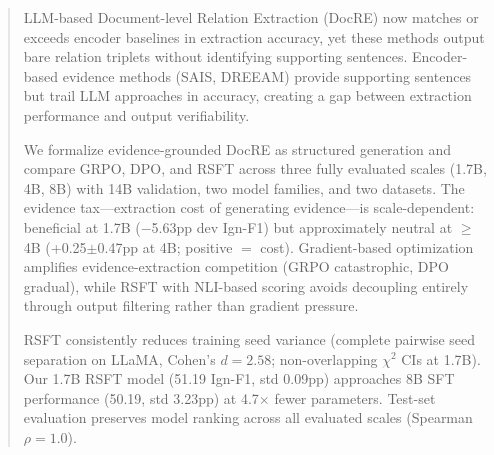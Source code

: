 \begin{abstract}

LLM-based Document-level Relation Extraction (DocRE) now matches or exceeds encoder baselines in extraction accuracy, yet these methods output bare relation triplets without identifying supporting sentences. Encoder-based evidence methods (SAIS, DREEAM) provide supporting sentences but trail LLM approaches in accuracy, creating a gap between extraction performance and output verifiability.

We formalize evidence-grounded DocRE as structured generation and compare GRPO, DPO, and RSFT across three fully evaluated scales (1.7B, 4B, 8B) with 14B validation, two model families, and two datasets. The evidence tax---extraction cost of generating evidence---is scale-dependent: beneficial at 1.7B ($-$5.63pp dev Ign-F1) but approximately neutral at $\geq$4B (+0.25$\pm$0.47pp at 4B; positive $=$ cost). Gradient-based optimization amplifies evidence-extraction competition (GRPO catastrophic, DPO gradual), while RSFT with NLI-based scoring avoids decoupling entirely through output filtering rather than gradient pressure.

RSFT consistently reduces training seed variance (complete pairwise seed separation on LLaMA, Cohen's $d{=}2.58$; non-overlapping $\chi^2$ CIs at 1.7B). Our 1.7B RSFT model (51.19 Ign-F1, std 0.09pp) approaches 8B SFT performance (50.19, std 3.23pp) at 4.7$\times$ fewer parameters. Test-set evaluation preserves model ranking across all evaluated scales (Spearman $\rho{=}1.0$).

\end{abstract}
